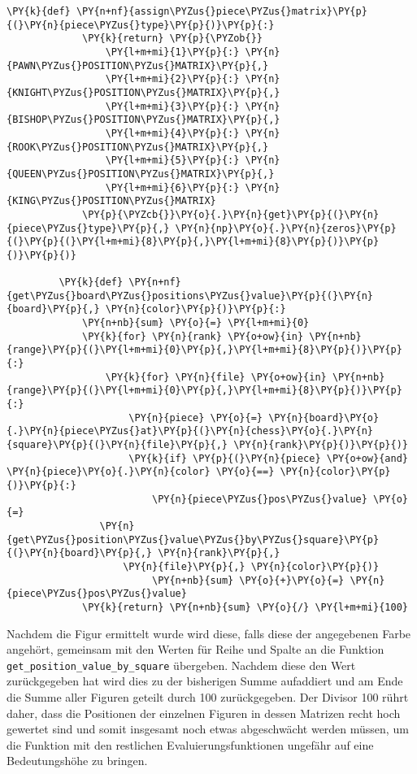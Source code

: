\begin{Verbatim}[commandchars=\\\{\}]
         \PY{k}{def} \PY{n+nf}{assign\PYZus{}piece\PYZus{}matrix}\PY{p}{(}\PY{n}{piece\PYZus{}type}\PY{p}{)}\PY{p}{:}
             \PY{k}{return} \PY{p}{\PYZob{}}
                 \PY{l+m+mi}{1}\PY{p}{:} \PY{n}{PAWN\PYZus{}POSITION\PYZus{}MATRIX}\PY{p}{,}
                 \PY{l+m+mi}{2}\PY{p}{:} \PY{n}{KNIGHT\PYZus{}POSITION\PYZus{}MATRIX}\PY{p}{,}
                 \PY{l+m+mi}{3}\PY{p}{:} \PY{n}{BISHOP\PYZus{}POSITION\PYZus{}MATRIX}\PY{p}{,}
                 \PY{l+m+mi}{4}\PY{p}{:} \PY{n}{ROOK\PYZus{}POSITION\PYZus{}MATRIX}\PY{p}{,}
                 \PY{l+m+mi}{5}\PY{p}{:} \PY{n}{QUEEN\PYZus{}POSITION\PYZus{}MATRIX}\PY{p}{,}
                 \PY{l+m+mi}{6}\PY{p}{:} \PY{n}{KING\PYZus{}POSITION\PYZus{}MATRIX}
             \PY{p}{\PYZcb{}}\PY{o}{.}\PY{n}{get}\PY{p}{(}\PY{n}{piece\PYZus{}type}\PY{p}{,} \PY{n}{np}\PY{o}{.}\PY{n}{zeros}\PY{p}{(}\PY{p}{(}\PY{l+m+mi}{8}\PY{p}{,}\PY{l+m+mi}{8}\PY{p}{)}\PY{p}{)}\PY{p}{)}
         
         \PY{k}{def} \PY{n+nf}{get\PYZus{}board\PYZus{}positions\PYZus{}value}\PY{p}{(}\PY{n}{board}\PY{p}{,} \PY{n}{color}\PY{p}{)}\PY{p}{:}
             \PY{n+nb}{sum} \PY{o}{=} \PY{l+m+mi}{0}
             \PY{k}{for} \PY{n}{rank} \PY{o+ow}{in} \PY{n+nb}{range}\PY{p}{(}\PY{l+m+mi}{0}\PY{p}{,}\PY{l+m+mi}{8}\PY{p}{)}\PY{p}{:}
                 \PY{k}{for} \PY{n}{file} \PY{o+ow}{in} \PY{n+nb}{range}\PY{p}{(}\PY{l+m+mi}{0}\PY{p}{,}\PY{l+m+mi}{8}\PY{p}{)}\PY{p}{:}
                     \PY{n}{piece} \PY{o}{=} \PY{n}{board}\PY{o}{.}\PY{n}{piece\PYZus{}at}\PY{p}{(}\PY{n}{chess}\PY{o}{.}\PY{n}{square}\PY{p}{(}\PY{n}{file}\PY{p}{,} \PY{n}{rank}\PY{p}{)}\PY{p}{)}
                     \PY{k}{if} \PY{p}{(}\PY{n}{piece} \PY{o+ow}{and} \PY{n}{piece}\PY{o}{.}\PY{n}{color} \PY{o}{==} \PY{n}{color}\PY{p}{)}\PY{p}{:}
                         \PY{n}{piece\PYZus{}pos\PYZus{}value} \PY{o}{=} 
				\PY{n}{get\PYZus{}position\PYZus{}value\PYZus{}by\PYZus{}square}\PY{p}{(}\PY{n}{board}\PY{p}{,} \PY{n}{rank}\PY{p}{,} 
					\PY{n}{file}\PY{p}{,} \PY{n}{color}\PY{p}{)}
                         \PY{n+nb}{sum} \PY{o}{+}\PY{o}{=} \PY{n}{piece\PYZus{}pos\PYZus{}value}
             \PY{k}{return} \PY{n+nb}{sum} \PY{o}{/} \PY{l+m+mi}{100}
\end{Verbatim}

    Nachdem die Figur ermittelt wurde wird diese, falls diese der
angegebenen Farbe angehört, gemeinsam mit den Werten für Reihe und
Spalte an die Funktion \texttt{get\_position\_value\_by\_square}
übergeben. Nachdem diese den Wert zurückgegeben hat wird dies zu der
bisherigen Summe aufaddiert und am Ende die Summe aller Figuren geteilt
durch 100 zurückgegeben. Der Divisor 100 rührt daher, dass die Positionen
der einzelnen Figuren in dessen Matrizen recht hoch gewertet sind und
somit insgesamt noch etwas abgeschwächt werden müssen, um die Funktion
mit den restlichen Evaluierungsfunktionen ungefähr auf eine
Bedeutungshöhe zu bringen.

